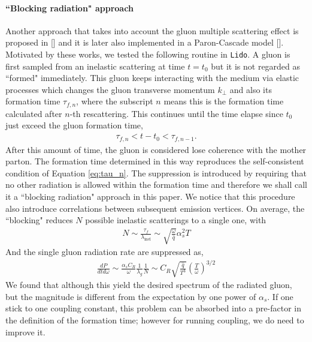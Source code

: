 \documentclass[aps, prc, reprint, amsmath, groupedaddress, nofootinbib]{revtex4-1}
\begin{document}
\paragraph*{``Blocking radiation" approach} Another approach that takes into account the gluon multiple scattering effect is proposed in [] and it is later also implemented in a Paron-Cascade model [].
Motivated by these works, we tested the following routine in {\tt Lido}. 
A gluon is first sampled from an inelastic scattering at time $t=t_0$ but it is not regarded as ``formed" immediately. 
This gluon keeps interacting with the medium via elastic processes which changes the gluon transverse momentum $k_\perp$ and also its formation time $\tau_{f,n}$, where the subscript $n$ means this is the formation time calculated after $n$-th rescattering.
This continues until the time elapse since $t_0$ just exceed the gluon formation time,
\begin{eqnarray}
\tau_{f, n} < t-t_0 < \tau_{f, n-1}.
\end{eqnarray}
After this amount of time, the gluon is considered lose coherence with the mother parton.
The formation time determined in this way reproduces the self-consistent condition of Equation \ref{eq:tau_n}.
The suppression is introduced by requiring that no other radiation is allowed within the formation time and therefore we shall call it a ``blocking radiation" approach in this paper.
We notice that this procedure also introduce correlations between subsequent emission vertices.
On average, the ``blocking" reduces $N$ possible inelastic scatterings to a single one, with
\begin{eqnarray}
N \sim \frac{\tau_f}{ \lambda_{\textrm{inel}}} \sim \sqrt{\frac{\omega}{\hat{q}}}\alpha_s^2 T
\end{eqnarray}
And the single gluon radiation rate are suppressed as,
\begin{eqnarray}\label{eq:PCM-spectra}
\frac{dP}{dt d\omega} \sim
 \frac{\alpha_s C_R}{\omega} \frac{1}{\lambda_g}\frac{1}{N} \sim C_R \sqrt{\frac{\hat{q}}{T^3}}\left(\frac{T}{\omega}\right)^{3/2}
\end{eqnarray}
We found that although this yield the desired spectrum of the radiated gluon, but the magnitude is different from the expectation by one power of $\alpha_s$. 
If one stick to one coupling constant, this problem can be absorbed into a pre-factor in the definition of the formation time; however for running coupling, we do need to improve it.
\end{document}

